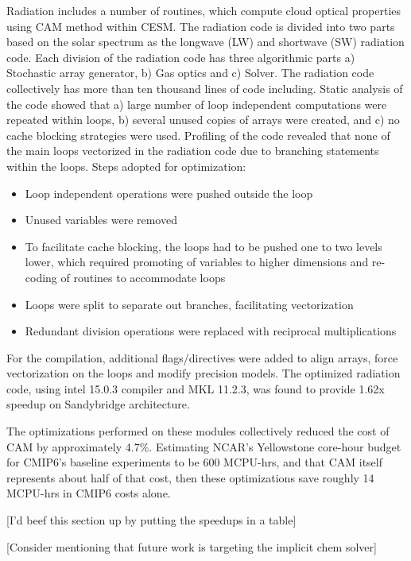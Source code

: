 Radiation includes a number of routines, which compute cloud optical properties using CAM method within CESM. The radiation code is divided into two parts based on the solar spectrum as the longwave (LW) and shortwave (SW) radiation code. Each division of the radiation code has three algorithmic parts a) Stochastic array generator, b) Gas optics and c) Solver. The radiation code collectively has more than ten thousand lines of code including. Static analysis of the code showed that a) large number of loop independent computations were repeated within loops, b) several unused copies of arrays were created, and c) no cache blocking strategies were used. 
Profiling of the code revealed that none of the main loops vectorized in the radiation code due to branching statements within the loops. Steps adopted for optimization:
\begin {itemize}
\item {Loop independent operations were pushed outside the loop}
\item {Unused variables were removed}
\item {To facilitate cache blocking, the loops had to be pushed one to two levels lower, which required promoting of variables to higher dimensions and re-coding of routines to accommodate loops}
\item {Loops were split to separate out branches, facilitating vectorization}
\item {Redundant division operations were replaced with reciprocal multiplications}
\end{itemize}

For the compilation, additional flags/directives were added to align arrays, force vectorization on the loops and modify precision models. 
The optimized radiation code, using intel 15.0.3 compiler and MKL 11.2.3, was found to provide 1.62x speedup on Sandybridge architecture. 

The optimizations performed on these modules collectively reduced the cost of CAM by approximately 4.7\%. Estimating NCAR’s Yellowstone core-hour budget for CMIP6’s baseline experiments to be 600 MCPU-hrs, and that CAM itself represents about half of that cost, then these optimizations save roughly 14 MCPU-hrs in CMIP6 costs alone. 

{\color{red} [I'd beef this section up by putting the speedups in a table]}

{\color{red} [Consider mentioning that future work is targeting the implicit chem solver]}
